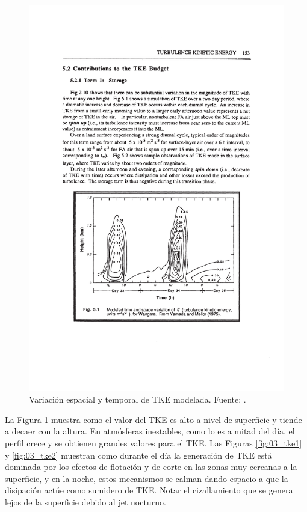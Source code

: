 \begin{figure}[h!]
	\centering
		\includegraphics[width=0.8\linewidth,trim={3cm 5.5cm 2.9cm 11.6cm},clip]{Imagenes/03/tke3}
	\caption{Variación espacial y temporal de TKE modelada. Fuente: \cite{stull1988introduction}.}
	\label{fig:03_tke3}
\end{figure}

La Figura \ref{fig:03_tke3} muestra como el valor del TKE es alto a nivel de superficie y tiende a decaer con la altura. En atmósferas inestables, como lo es a mitad del día, el perfil crece y se obtienen grandes valores para el TKE. Las Figuras \ref{fig:03_tke1} y \ref{fig:03_tke2} muestran como durante el día la generación de TKE está dominada por los efectos de flotación y de corte en las zonas muy cercanas a la superficie, y en la noche, estos mecanismos se calman dando espacio a que la disipación actúe como sumidero de TKE. Notar el cizallamiento que se genera lejos de la superficie debido al jet nocturno.

